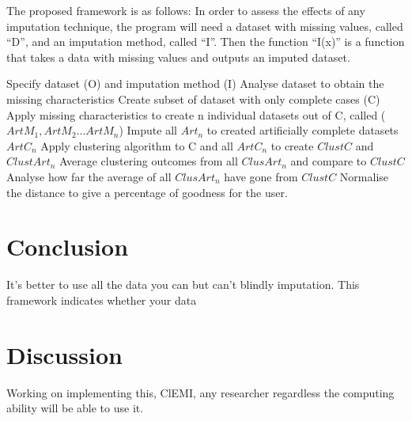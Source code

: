 \documentclass{IEEEconf}
\begin{document}
		The proposed framework is as follows: In order to assess the effects of any imputation technique, the program will need a dataset with missing values, called ``D'', and an imputation method, called ``I''. Then the function ``I(x)'' is a function that takes a data with missing values and outputs an imputed dataset. 

		Specify dataset (O) and imputation method (I)
		Analyse dataset to obtain the missing characteristics
		Create subset of dataset with only complete cases (C)
		Apply missing characteristics to create n individual datasets out of C, called ($ArtM_{1}, ArtM_{2}...ArtM_{n}$)
		Impute all $Art_{n}$ to created artificially complete datasets $ArtC_{n}$
		Apply clustering algorithm to C and all $ArtC_{n}$ to create $ClustC$ and $ClustArt_{n}$
		Average clustering outcomes from all $ClusArt_{n}$ and compare to $ClustC$
		Analyse how far the average of all $ClusArt_{n}$ have gone from $ClustC$
		Normalise the distance to give a percentage of goodness for the user.

	\section{Conclusion} %
	\label{sec:conclusion}
	It's better to use all the data you can but can't blindly imputation. This framework indicates whether your data 

	\section{Discussion} %
	\label{sec:discussion}
	Working on implementing this, ClEMI, any researcher regardless the computing ability will be able to use it. 

	
	
\end{document}
